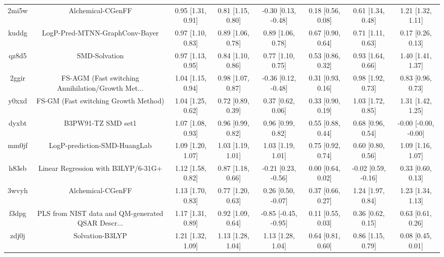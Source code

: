 \documentclass{article}
\begin{document}
\begin{center}
\begin{longtable}{|cccccccc|}
 2mi5w &                                  Alchemical-CGenFF &  0.95 [1.31, 0.91] &  0.81 [1.15, 0.80] &   -0.30 [0.13, -0.48] &  0.18 [0.56, 0.08] &     0.61 [1.34, 0.48] &     1.21 [1.32, 1.11] \\
 kuddg &                     LogP-Pred-MTNN-GraphConv-Bayer &  0.97 [1.10, 0.83] &  0.89 [1.06, 0.78] &     0.89 [1.06, 0.78] &  0.67 [0.90, 0.64] &     0.71 [1.11, 0.63] &     0.17 [0.26, 0.13] \\
 qz8d5 &                                      SMD-Solvation &  0.97 [1.13, 0.95] &  0.84 [1.10, 0.86] &     0.77 [1.10, 0.75] &  0.53 [0.86, 0.32] &     0.93 [1.64, 0.66] &     1.40 [1.41, 1.37] \\
 2ggir &  FS-AGM (Fast switching Annihilation/Growth Met... &  1.04 [1.15, 0.94] &  0.98 [1.07, 0.87] &   -0.36 [0.12, -0.48] &  0.31 [0.93, 0.16] &     0.98 [1.92, 0.73] &     0.83 [0.96, 0.73] \\
 y0xxd &               FS-GM (Fast switching Growth Method) &  1.04 [1.25, 0.62] &  0.72 [0.89, 0.39] &     0.37 [0.62, 0.06] &  0.33 [0.90, 0.19] &     1.03 [1.72, 0.85] &     1.31 [1.42, 1.25] \\
 dyxbt &                                 B3PW91-TZ SMD set1 &  1.07 [1.08, 0.93] &  0.96 [0.99, 0.82] &     0.96 [0.99, 0.82] &  0.55 [0.88, 0.44] &     0.68 [0.96, 0.54] &  -0.00 [-0.00, -0.00] \\
 mm0jf &                       LogP-prediction-SMD-HuangLab &  1.09 [1.20, 1.07] &  1.03 [1.19, 1.01] &     1.03 [1.19, 1.01] &  0.75 [0.92, 0.74] &     0.60 [0.80, 0.56] &     1.09 [1.16, 1.07] \\
 h83sb &                Linear Regression with B3LYP/6-31G+ &  1.12 [1.58, 0.82] &  0.87 [1.18, 0.66] &   -0.21 [0.23, -0.56] &  0.00 [0.64, 0.02] &   -0.02 [0.59, -0.16] &     0.33 [0.60, 0.13] \\
 3wvyh &                                  Alchemical-CGenFF &  1.13 [1.70, 0.83] &  0.77 [1.20, 0.63] &    0.26 [0.50, -0.07] &  0.37 [0.66, 0.27] &     1.24 [1.97, 0.84] &     1.23 [1.34, 1.13] \\
 f3dpg &  PLS from NIST data and QM-generated QSAR Descr... &  1.17 [1.31, 0.89] &  0.92 [1.09, 0.64] &  -0.85 [-0.45, -0.95] &  0.11 [0.55, 0.03] &     0.36 [0.62, 0.15] &     0.63 [0.61, 0.26] \\
 zdj0j &                                    Solvation-B3LYP &  1.21 [1.32, 1.09] &  1.13 [1.28, 1.04] &     1.13 [1.28, 1.04] &  0.64 [0.81, 0.60] &     0.86 [1.15, 0.79] &     0.08 [0.45, 0.01] \\

\end{longtable}
\end{center}
\end{document}
